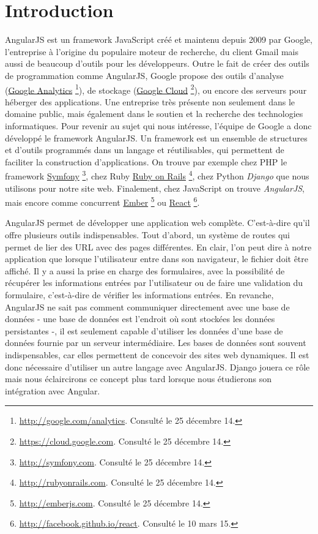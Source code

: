 \documentclass[a4paper,10pt,twoside]{sphinxmanual}
\begin{document}
\section{Introduction}
\label{angularjs:introduction}
AngularJS est un framework JavaScript créé et maintenu depuis 2009 par Google, l'entreprise à l'origine du populaire moteur de recherche, du client Gmail mais aussi de beaucoup d'outils pour les développeurs. Outre le fait de créer des outils de programmation comme AngularJS, Google propose des outils d'analyse (\href{http://google.com/analytics}{Google Analytics} \footnote{
\href{http://google.com/analytics}{http://google.com/analytics}. Consulté le 25 décembre 14.
}), de stockage (\href{https://cloud.google.com}{Google Cloud} \footnote{
\href{https://cloud.google.com}{https://cloud.google.com}. Consulté le 25 décembre 14.
}), ou encore des serveurs pour héberger des applications. Une entreprise très présente non seulement dans le domaine public, mais également dans le soutien et la recherche des technologies informatiques. Pour revenir au sujet qui nous intéresse, l'équipe de Google a donc développé le framework AngularJS. Un framework est un ensemble de structures et d'outils programmés dans un langage et réutilisables, qui permettent de faciliter la construction d'applications. On trouve par exemple chez PHP le framework \href{http://symfony.com}{Symfony} \footnote{
\href{http://symfony.com}{http://symfony.com}. Consulté le 25 décembre 14.
}, chez Ruby \href{http://rubyonrails.com}{Ruby on Rails} \footnote{
\href{http://rubyonrails.com}{http://rubyonrails.com}. Consulté le 25 décembre 14.
}, chez Python \emph{Django} que nous utilisons pour notre site web. Finalement, chez JavaScript on trouve \emph{AngularJS}, mais encore comme concurrent \href{http://emberjs.com}{Ember} \footnote{
\href{http://emberjs.com}{http://emberjs.com}. Consulté le 25 décembre 14.
} ou \href{http://facebook.github.io/react/}{React} \footnote{
\href{http://facebook.github.io/react}{http://facebook.github.io/react}. Consulté le 10 mars 15.
}.

AngularJS permet de développer une application web complète. C'est-à-dire qu'il offre plusieurs outils indispensables. Tout d'abord, un système de routes qui permet de lier des URL avec des pages différentes. En clair, l'on peut dire à notre application que lorsque l'utilisateur entre  dans son navigateur, le fichier  doit être affiché. Il y a aussi la prise en charge des formulaires, avec la possibilité de récupérer les informations entrées par l'utilisateur ou de faire une validation du formulaire, c'est-à-dire de vérifier les informations entrées. En revanche, AngularJS ne sait pas comment communiquer directement avec une base de données - une base de données est l'endroit où sont stockées les données persistantes -, il est seulement capable d'utiliser les données d'une base de données fournie par un serveur intermédiaire. Les bases de données sont souvent indispensables, car elles permettent de concevoir des sites web dynamiques. Il est donc nécessaire d'utiliser un autre langage avec AngularJS. Django jouera ce rôle mais nous éclaircirons ce concept plus tard lorsque nous étudierons son intégration avec Angular.
\end{document}

